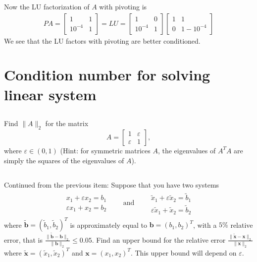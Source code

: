 \documentclass[11pt,letterpaper]{report}
\begin{document}
Now the LU factorization of $A$ with pivoting is
\begin{align*}
PA = \begin{bmatrix} 1 & 1 \\ 10^{-4} & 1
  \end{bmatrix} = LU =
  \begin{bmatrix} 1 & 0\\ 10^{-4} & 1
  \end{bmatrix}
  \begin{bmatrix} 1 & 1\\ 0 & 1-10^{-4}
  \end{bmatrix}
\end{align*}
We see that the LU factors with pivoting are better conditioned.

\section{Condition number for solving linear system}  
\subsection{}
Find $\|{A}\|_2$ for the matrix 
\[
A = \begin{bmatrix} 1 & \varepsilon \\ \varepsilon & 1 \end{bmatrix},
\]where $\varepsilon \in (0,1)$ (Hint: for symmetric matrices $A$, the
eigenvalues of $A^T A$ are simply the squares of the eigenvalues of
$A$).

\subsection{}
Continued from the previous item: Suppose that you have two systems
\begin{align*}
\begin{matrix}
x_1 + \varepsilon x_2 = b_1 \\
 \varepsilon x_1 + x_2 = b_2  
\end{matrix}\qquad \text{and}\qquad
\begin{matrix}
\tilde x_1 + \varepsilon \tilde x_2 = \tilde b_1 \\
 \varepsilon \tilde x_1 + \tilde x_2 = \tilde b_2
\end{matrix}
\end{align*}
where $\tilde{\boldsymbol b} = (\tilde b_1, \tilde b_2)^T$ is
approximately equal to ${\boldsymbol b}=( b_1, b_2)^T$, with a $5\%$
relative error, that is $\frac{\|{\tilde {\boldsymbol b} -
    {\boldsymbol b}}\|_2}{\|{{\boldsymbol b}}\|_2} \leq 0.05$.  Find
an upper bound for the relative error $\frac{\|\tilde {\boldsymbol x}
  - {\boldsymbol x}\|_2}{\|{\boldsymbol x}\|_2}$ where $\tilde
{\boldsymbol x} = (\tilde x_1, \tilde x_2)^T$ and ${\boldsymbol x} =
(x_1,x_2)^T$. This upper bound will depend on $\varepsilon$.
\end{document}
